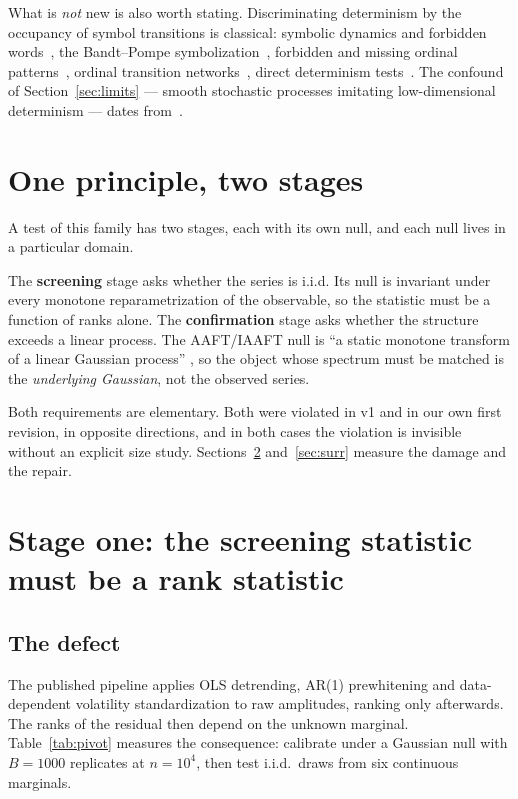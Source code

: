 \documentclass[11pt]{article}
\begin{document}
What is \emph{not} new is also worth stating. Discriminating determinism by the
occupancy of symbol transitions is classical: symbolic dynamics and forbidden
words~\cite{crutchfield}, the Bandt--Pompe symbolization~\cite{bandtpompe},
forbidden and missing ordinal patterns~\cite{amigo,zanin}, ordinal transition
networks~\cite{mccullough}, direct determinism tests~\cite{kaplanglass,sugihara}.
The confound of Section~\ref{sec:limits} --- smooth stochastic processes
imitating low-dimensional determinism --- dates
from~\cite{theiler1986,osborne}.

\section{One principle, two stages}

A test of this family has two stages, each with its own null, and each null
lives in a particular domain.

The \textbf{screening} stage asks whether the series is i.i.d. Its null is
invariant under every monotone reparametrization of the observable, so the
statistic must be a function of ranks alone. The \textbf{confirmation} stage
asks whether the structure exceeds a linear process. The AAFT/IAAFT null is
``a static monotone transform of a linear Gaussian process''
\cite{theiler1992,schreiber}, so the object whose spectrum must be matched is
the \emph{underlying Gaussian}, not the observed series.

Both requirements are elementary. Both were violated in v1 and in our own first
revision, in opposite directions, and in both cases the violation is invisible
without an explicit size study. Sections~\ref{sec:screen} and~\ref{sec:surr}
measure the damage and the repair.

\section{Stage one: the screening statistic must be a rank statistic}
\label{sec:screen}

\subsection{The defect}

The published pipeline applies OLS detrending, AR(1) prewhitening and
data-dependent volatility standardization to raw amplitudes, ranking only
afterwards. The ranks of the residual then depend on the unknown marginal.
Table~\ref{tab:pivot} measures the consequence: calibrate under a Gaussian null
with $B=1000$ replicates at $n=10^4$, then test i.i.d.\ draws from six
continuous marginals.
\end{document}
